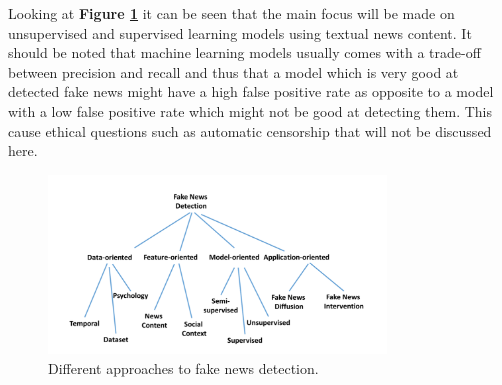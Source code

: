 Looking at \textbf{Figure \ref{fig:intro:features}} it can be seen that the main focus will be made on unsupervised and supervised learning models using textual news content. It should be noted that machine learning models usually comes with a trade-off between precision and recall and thus that a model which is very good at detected fake news might have a high false positive rate as opposite to a model with a low false positive rate which might not be good at detecting them. This cause ethical questions such as automatic censorship that will not be discussed here. 
\begin{figure}
 \centering
 \includegraphics[width=0.8\textwidth]{images/introduction/features}
 \caption{Different approaches to fake news detection.}
 \label{fig:intro:features}
\end{figure}